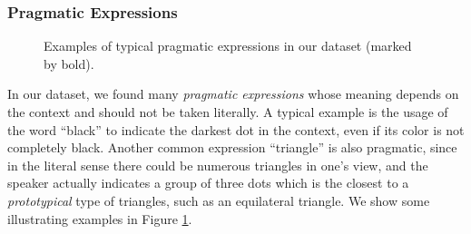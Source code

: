 \subsubsection{Pragmatic Expressions}

\begin{figure}[th!]
\centering
{}
\caption{
Examples of typical pragmatic expressions in our dataset (marked by bold).
}
\label{03_fig:pragmatics}
\end{figure}

In our dataset, we found many \emph{pragmatic expressions} whose meaning depends on the context and should not be taken literally. A typical example is the usage of the word ``black'' to indicate the darkest dot in the context, even if its color is not completely black. Another common expression ``triangle'' is also pragmatic, since in the literal sense there could be numerous triangles in one's view, and the speaker actually indicates a group of three dots which is the closest to a \textit{prototypical} type of triangles, such as an equilateral triangle. We show some illustrating examples in Figure \ref{03_fig:pragmatics}.

